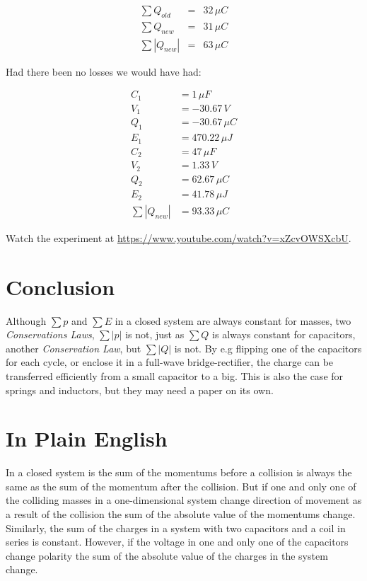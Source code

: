 \documentclass[]{../common/elementary-physics}
\begin{document}
\begin{eqnarray}
\sum Q_{old} &=& 32 \, \mu C \\
\sum Q_{new} &=& 31 \, \mu C \\
\sum |Q_{new}| &=& 63 \, \mu C
\end{eqnarray}

Had there been no losses we would have had:

\begin{align}
C_1 &= 1 \, \mu F \\
V_1 &= -30.67 \, V \\
Q_1 &= -30.67 \, \mu C \\
E_1 &= 470.22 \, \mu J \\
C_2 &= 47 \, \mu F \\
V_2 &= 1.33 \, V \\
Q_2 &= 62.67 \, \mu C \\
E_2 &= 41.78 \, \mu J \\
\sum |Q_{new}| &= 93.33 \, \mu C
\end{align}

Watch the experiment at \url{https://www.youtube.com/watch?v=xZcvOWSXcbU}.

\section{Conclusion}

Although $\sum p$ and $\sum E$ in a closed system are always constant for masses, two \textit{Conservations Laws}, $\sum | p |$ is not, just as $\sum Q$ is always constant for capacitors, another \textit{Conservation Law}, but $\sum | Q |$ is not.
By e.g flipping one of the capacitors for each cycle, or enclose it in a full-wave bridge-rectifier, the charge can be transferred efficiently from a small capacitor to a big.
This is also the case for springs and inductors, but they may need a paper on its own.

\appendix

\section{In Plain English}

In a closed system is the sum of the momentums before a collision is always the same as the sum of the momentum after the collision.
But if one and only one of the colliding masses in a one-dimensional system change direction of movement as a result of the collision the sum of the absolute value of the momentums change.
Similarly, the sum of the charges in a system with two capacitors and a coil in series is constant.
However, if the voltage in one and only one of the capacitors change polarity the sum of the absolute value of the charges in the system change.
\end{document}
